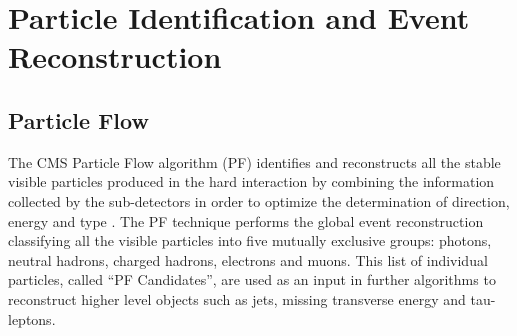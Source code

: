 \chapter[Particle Identification and Event Reconstruction]{Particle Identification and Event Reconstruction}
\label{chap:ParticleID}



\section{Particle Flow}
\label{sec:PF}

The CMS Particle Flow algorithm (PF) identifies and reconstructs all the stable visible 
particles produced in the hard interaction by combining the information collected by the sub-detectors in order 
to optimize the determination of direction, energy and type \cite{CMS-PAS-PFT-09-001}. The PF technique performs the global 
event reconstruction classifying all the visible particles into five mutually exclusive groups: photons, 
neutral hadrons, charged hadrons, electrons and muons. This list of individual particles, called ``PF Candidates'', are used 
as an input in further algorithms to reconstruct higher level objects such as jets, missing transverse energy and tau-leptons. \\



